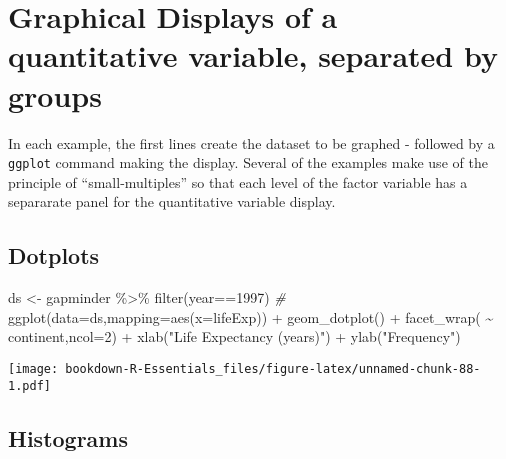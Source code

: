 \documentclass[
]{book}
\newenvironment{Shaded}{\begin{snugshade}}{\end{snugshade}}
\newcommand{\AttributeTok}[1]{\textcolor[rgb]{0.77,0.63,0.00}{#1}}
\newcommand{\CommentTok}[1]{\textcolor[rgb]{0.56,0.35,0.01}{\textit{#1}}}
\newcommand{\DecValTok}[1]{\textcolor[rgb]{0.00,0.00,0.81}{#1}}
\newcommand{\FunctionTok}[1]{\textcolor[rgb]{0.00,0.00,0.00}{#1}}
\newcommand{\NormalTok}[1]{#1}
\newcommand{\OtherTok}[1]{\textcolor[rgb]{0.56,0.35,0.01}{#1}}
\newcommand{\SpecialCharTok}[1]{\textcolor[rgb]{0.00,0.00,0.00}{#1}}
\newcommand{\StringTok}[1]{\textcolor[rgb]{0.31,0.60,0.02}{#1}}
\begin{document}
\hypertarget{graphical-displays-of-a-quantitative-variable-separated-by-groups}{%
\section{Graphical Displays of a quantitative variable, separated by groups}\label{graphical-displays-of-a-quantitative-variable-separated-by-groups}}

In each example, the first lines create the dataset to be graphed - followed by a \texttt{ggplot} command making the display. Several of the examples make use of the principle of ``small-multiples'' so that each level of the factor variable has a separarate panel for the quantitative variable display.

\hypertarget{dotplots}{%
\subsection{Dotplots}\label{dotplots}}

\begin{Shaded}
\begin{Highlighting}[]
\NormalTok{ds }\OtherTok{\textless{}{-}}\NormalTok{ gapminder }\SpecialCharTok{\%\textgreater{}\%} \FunctionTok{filter}\NormalTok{(year}\SpecialCharTok{==}\DecValTok{1997}\NormalTok{) }
\CommentTok{\#}
\FunctionTok{ggplot}\NormalTok{(}\AttributeTok{data=}\NormalTok{ds,}\AttributeTok{mapping=}\FunctionTok{aes}\NormalTok{(}\AttributeTok{x=}\NormalTok{lifeExp)) }\SpecialCharTok{+} 
  \FunctionTok{geom\_dotplot}\NormalTok{() }\SpecialCharTok{+} 
  \FunctionTok{facet\_wrap}\NormalTok{( }\SpecialCharTok{\textasciitilde{}}\NormalTok{ continent,}\AttributeTok{ncol=}\DecValTok{2}\NormalTok{) }\SpecialCharTok{+} 
  \FunctionTok{xlab}\NormalTok{(}\StringTok{"Life Expectancy (years)"}\NormalTok{) }\SpecialCharTok{+}
  \FunctionTok{ylab}\NormalTok{(}\StringTok{"Frequency"}\NormalTok{)}
\end{Highlighting}
\end{Shaded}

\texttt{[image: bookdown-R-Essentials\_files/figure-latex/unnamed-chunk-88-1.pdf]}

\hypertarget{histograms}{%
\subsection{Histograms}\label{histograms}}
\end{document}
